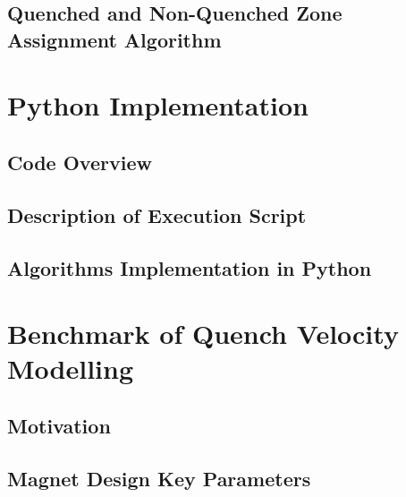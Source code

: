\documentclass[11pt,a4paper]{report}
\begin{document}
\section{Quenched and Non-Quenched Zone Assignment Algorithm}
\label{section:node_searching_algorithm}


\clearpage
\chapter{Python Implementation}
\label{chapter:python_implementation}

\section{Code Overview}
\label{section:code_overview}


\section{Description of Execution Script}


\section{Algorithms Implementation in Python}
\label{section:description_main_classes}


\clearpage
\chapter{Benchmark of Quench Velocity Modelling}
\label{chapter:quench_velocity_benchmarking}

\section{Motivation}


\section{Magnet Design Key Parameters}
\label{section:magnet_design_key_parameters}

\end{document}
